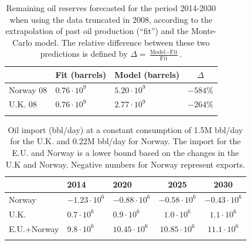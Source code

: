 \documentclass[review]{elsarticle}
\providecommand{\tabularnewline}{\\}
\begin{document}
\pagebreak


\begin{table}[H]
\caption{Remaining oil reserves forecasted for the period 2014-2030 when using
the data truncated in 2008, according to the extrapolation of past oil production (``fit'') and 
the Monte-Carlo model. The relative difference between these two predictions 
is defined by $\Delta=\frac{\textrm{Model}-\textrm{Fit}}{\textrm{Fit}}$.}
\centering %
\begin{tabular}{lllc}
 & Fit (barrels) & Model (barrels) & $\Delta$ \tabularnewline
\midrule Norway 08 & $0.76\cdot10^{9}$  & $5.20\cdot10^{9}$  & $-584\%$\tabularnewline
U.K. 08 & $0.76\cdot10^{9}$  & $2.77\cdot10^{9}$  & $-264\%$ \tabularnewline
\bottomrule  &  &  & \tabularnewline
\end{tabular}\label{forecast-08}
\end{table}

\pagebreak


\begin{table}[H]
\caption{Oil import (bbl/day) at a constant consumption of 1.5M bbl/day for
the U.K. and 0.22M bbl/day for Norway. The import for the E.U. and
Norway is a lower bound based on the changes in the U.K and Norway. Negative
numbers for Norway represent exports.}
\centering %
\begin{tabular}{lllcc}
 & 2014 & 2020 & 2025 & 2030\tabularnewline
\midrule Norway & $-1.23\cdot10^{6}$  & $-0.88\cdot10^{6}$  & $-0.58\cdot10^{6}$  & $-0.43\cdot10^{6}$ \tabularnewline
U.K. & $0.7\cdot10^{6}$  & $0.9\cdot10^{6}$  & $1.0\cdot10^{6}$  & $1.1\cdot10^{6}$ \tabularnewline
E.U.+Norway & $9.8\cdot10^{6}$  & $10.45\cdot10^{6}$  & $10.85\cdot10^{6}$  & $11.1\cdot10^{6}$ \tabularnewline
\bottomrule  &  &  &  & \tabularnewline
\end{tabular}\label{needs}
\end{table}
\end{document}
